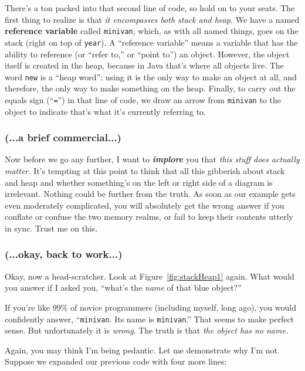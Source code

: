 There's a ton packed into that second line of code, so hold on to your seats.
The first thing to realize is that \textit{it encompasses both stack and
heap.} We have a named \textbf{reference variable} called \texttt{minivan},
which, as with all named things, goes on the stack (right on top of
\texttt{year}). A ``reference variable'' means a variable that has the ability
to reference (or ``refer to,'' or ``point to'') an object. However, the object
itself is created in the heap, because in Java that's where all objects live.
The word \texttt{new} is a ``heap word'': using it is the only way to make an
object at all, and therefore, the only way to make something on the heap.
Finally, to carry out the equals sign (``\texttt{=}'') in that line of code, we
draw an arrow from \texttt{minivan} to the object to indicate that's what it's
currently referring to.

\subsubsection{(...a brief commercial...)}

Now before we go any further, I want to \textit{\textbf{implore}} you that
\textit{this stuff does actually matter.} It's tempting at this point to think
that all this gibberish about stack and heap and whether something's on the
left or right side of a diagram is irrelevant.  Nothing could be further from
the truth. As soon as our example gets even moderately complicated, you will
absolutely get the wrong answer if you conflate or confuse the two memory
realms, or fail to keep their contents utterly in sync. Trust me on this.

\subsubsection{(...okay, back to work...)}

Okay, now a head-scratcher. Look at Figure~\ref{fig:stackHeap1} again. What
would you answer if I asked you, ``what's the \textit{name} of that blue
object?''

If you're like 99\% of novice programmers (including myself, long ago), you
would confidently answer, ``\texttt{minivan}. Its name is \texttt{minivan}.''
That seems to make perfect sense. But unfortunately it is \textit{wrong}. The
truth is that \textit{the object has no name.}

Again, you may think I'm being pedantic. Let me demonstrate why I'm not.
Suppose we expanded our previous code with four more lines:

